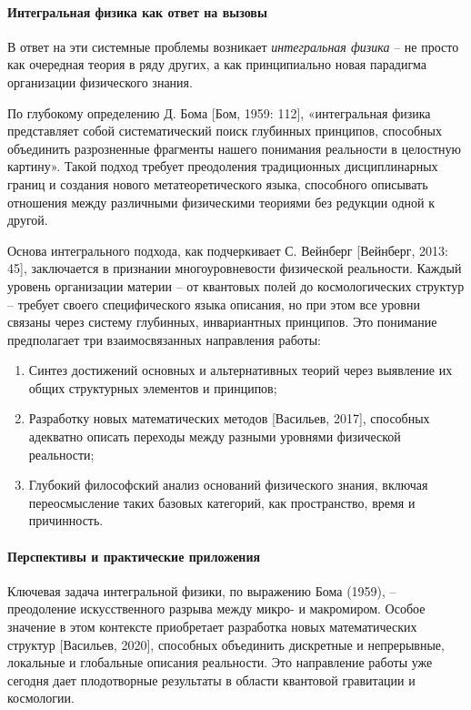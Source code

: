     \paragraph*{Интегральная физика как ответ на вызовы}
    В ответ на эти системные проблемы возникает \textit{интегральная физика} – не просто как очередная теория в ряду других, а как принципиально новая парадигма организации физического знания. 

    По глубокому определению Д. Бома [Бом, 1959: 112], «интегральная физика представляет собой систематический поиск глубинных принципов, способных объединить разрозненные фрагменты нашего понимания реальности в целостную картину». Такой подход требует преодоления традиционных дисциплинарных границ и создания нового метатеоретического языка, способного описывать отношения между различными физическими теориями без редукции одной к другой.

    Основа интегрального подхода, как подчеркивает С. Вейнберг [Вейнберг, 2013: 45], заключается в признании многоуровневости физической реальности. Каждый уровень организации материи – от квантовых полей до космологических структур – требует своего специфического языка описания, но при этом все уровни связаны через систему глубинных, инвариантных принципов. Это понимание предполагает три взаимосвязанных направления работы:
    \begin{enumerate}
        \item Синтез достижений основных и альтернативных теорий через выявление их общих структурных элементов и принципов;
        \item Разработку новых математических методов [Васильев, 2017], способных адекватно описать переходы между разными уровнями физической реальности;
        \item Глубокий философский анализ оснований физического знания, включая переосмысление таких базовых категорий, как пространство, время и причинность.
    \end{enumerate}

    \paragraph*{Перспективы и практические приложения}
    Ключевая задача интегральной физики, по выражению Бома (1959), – преодоление искусственного разрыва между микро- и макромиром. Особое значение в этом контексте приобретает разработка новых математических структур [Васильев, 2020], способных объединить дискретные и непрерывные, локальные и глобальные описания реальности. Это направление работы уже сегодня дает плодотворные результаты в области квантовой гравитации и космологии.

